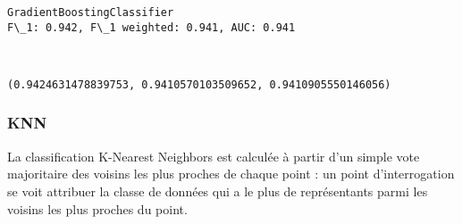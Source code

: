 \documentclass[11pt]{article}
\makeatletter
\newcommand{\boxspacing}{\kern\kvtcb@left@rule\kern\kvtcb@boxsep}
\newcommand{\prompt}[4]{
        {\ttfamily\llap{{\color{#2}[#3]:\hspace{3pt}#4}}\vspace{-\baselineskip}}
    }
\makeatother
\begin{document}
    \begin{Verbatim}[commandchars=\\\{\}]
GradientBoostingClassifier
F\_1: 0.942, F\_1 weighted: 0.941, AUC: 0.941
    \end{Verbatim}

    \begin{center}
    \end{center}
    { \hspace*{\fill} \\}
    
            \begin{tcolorbox}[breakable, size=fbox, boxrule=.5pt, pad at break*=1mm, opacityfill=0]
\prompt{Out}{outcolor}{37}{\boxspacing}
\begin{Verbatim}[commandchars=\\\{\}]
(0.9424631478839753, 0.9410570103509652, 0.9410905550146056)
\end{Verbatim}
\end{tcolorbox}
        
    \hypertarget{knn}{%
\subsubsection{KNN}\label{knn}}

La classification K-Nearest Neighbors est calculée à partir d'un simple
vote majoritaire des voisins les plus proches de chaque point : un point
d'interrogation se voit attribuer la classe de données qui a le plus de
représentants parmi les voisins les plus proches du point.
\end{document}
